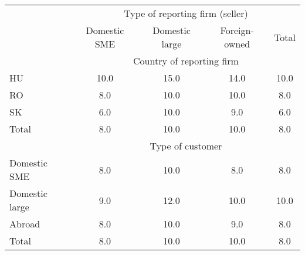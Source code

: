 
\begin{tabular}{lcccc} \hline
	&\multicolumn{4}{c}{Type of reporting firm (seller)}	\\		
	&Domestic SME&	Domestic large&	Foreign-owned&	Total\\
	\hline
&\multicolumn{4}{c}{Country of reporting firm}				\\
HU&	10.0&	15.0&	14.0&	10.0\\
RO&	8.0&	10.0&	10.0&	8.0\\
SK&	6.0&	10.0&	9.0&	6.0\\
Total&	8.0&	10.0&	10.0&	8.0\\
\hline
&\multicolumn{4}{c}{Type of customer}				\\
Domestic SME&	8.0&	10.0&	8.0&	8.0\\
Domestic large&	9.0&	12.0&	10.0&	10.0\\
Abroad&	8.0&	10.0&	9.0&	8.0\\
Total&	8.0&	10.0&	10.0&	8.0\\
\hline
\end{tabular}

